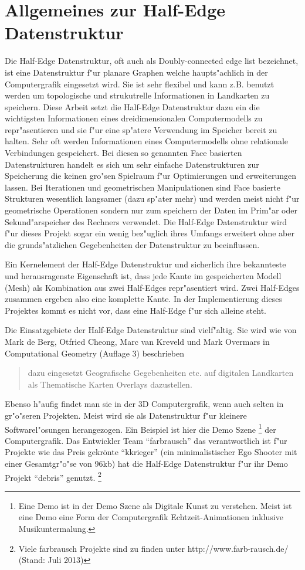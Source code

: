 \documentclass[pagesize, paper=a4, fontsize=12pt,titlepage=true, headings=small, headnosepline, abstractoff, liststotoc, nochapterprefix, plainheadsepline]{scrreprt}
\newcommand{\HES}{Half-Edge Datenstruktur }
\begin{document}
	\section {Allgemeines zur \HES}
		Die Half-Edge Datenstruktur, oft auch als Doubly-connected edge list bezeichnet, ist eine Datenstruktur f"ur planare Graphen welche haupts"achlich in der Computergrafik eingesetzt wird. Sie ist sehr flexibel und kann z.B. benutzt werden um topologische und strukutrelle Informationen in Landkarten zu speichern. Diese Arbeit setzt die \HES dazu ein die wichtigsten Informationen eines dreidimensionalen Computermodells zu repr"asentieren und sie f"ur eine sp"atere Verwendung im Speicher bereit zu halten. Sehr oft werden Informationen eines Computermodells ohne relationale Verbindungen gespeichert. Bei diesen so genannten Face basierten Datenstrukturen handelt es sich um sehr einfache Datenstrukturen zur Speicherung die keinen gro"sen Spielraum f"ur Optimierungen und erweiterungen lassen. Bei Iterationen und geometrischen Manipulationen sind Face basierte Strukturen wesentlich langsamer (dazu sp"ater mehr) und werden meist nicht f"ur geometrische Operationen sondern nur zum speichern der Daten im Prim"ar oder Sekund"arspeicher des Rechners verwendet. Die \HES wird f"ur dieses Projekt sogar ein wenig bez"uglich ihres Umfangs erweitert ohne aber die grunds"atzlichen Gegebenheiten der Datenstruktur zu beeinflussen.

Ein Kernelement der \HES und sicherlich ihre bekannteste und herausragenste Eigenschaft ist, dass jede Kante im gespeicherten Modell (Mesh) als Kombination aus zwei Half-Edges repr"asentiert wird. Zwei Half-Edges zusammen ergeben also eine komplette Kante. In der Implementierung dieses Projektes kommt es nicht vor, dass eine Half-Edge f"ur sich alleine steht.

Die Einsatzgebiete der \HES sind vielf"altig. Sie wird wie von Mark de Berg, Otfried Cheong, Marc van Kreveld und Mark Overmars in Computational Geometry \cite{vanMarkdeBerg.2008} (Auflage 3) beschrieben  \begin{quote}dazu eingesetzt Geografische Gegebenheiten etc. auf digitalen Landkarten  als Thematische Karten Overlays dazustellen. \cite[S.~29]{vanMarkdeBerg.2008}\end{quote} Ebenso h"aufig findet man sie in der 3D Computergrafik, wenn auch selten in gr"o"seren Projekten. Meist wird sie als Datenstruktur f"ur kleinere Softwarel"osungen herangezogen. Ein Beispiel ist hier die Demo Szene \footnote[1]{Eine Demo ist in der Demo Szene als Digitale Kunst zu verstehen. Meist ist eine Demo eine Form der Computergrafik Echtzeit-Animationen inklusive Musikuntermalung.} der Computergrafik. Das Entwickler Team "`farbrausch"' das verantwortlich ist f"ur Projekte wie das Preis gekrönte "`kkrieger"' (ein minimalistischer Ego Shooter mit einer Gesamtgr"o"se von 96kb) hat die \HES f"ur ihr Demo Projekt "`debris"' genutzt. \footnote[2]{Viele farbrausch Projekte sind zu finden unter http://www.farb-rausch.de/ (Stand: Juli 2013)}
\end{document}
